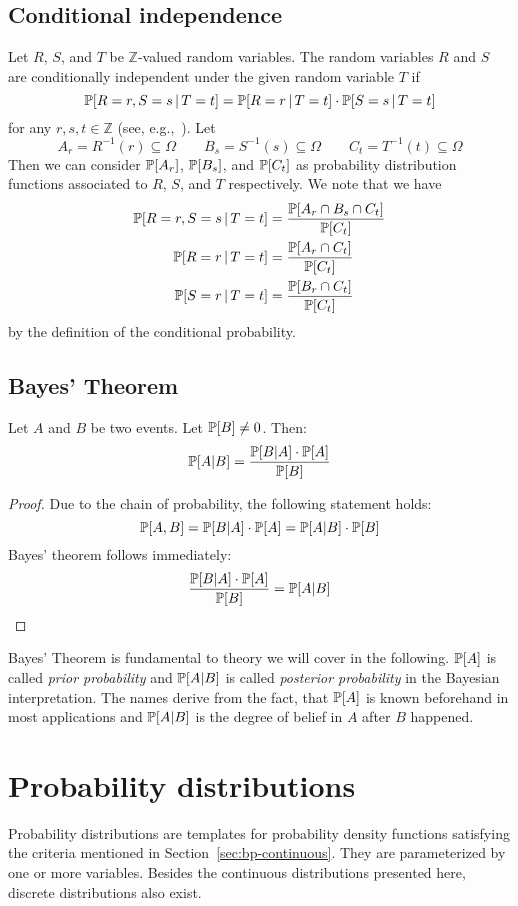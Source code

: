 \subsection{Conditional independence}
\label{sec:bp-cond-indep}
%
Let $R$, $S$, and $T$ be $\mathbb Z$-valued random variables.
The random variables $R$ and $S$ are conditionally independent under the given random variable $T$
if
\[
  \mathbb P[R=r, S=s\,|\,T=t] =
  \mathbb P[R=r\,|\,T=t] \cdot \mathbb P[S=s\,|\,T=t]
\]
for any $r, s, t \in \mathbb Z$ (see, e.g.,~\cite[3.1]{dawid}).
Let
\[
  A_r = R^{-1}(r) \subseteq \Omega \qquad
  B_s = S^{-1}(s) \subseteq \Omega \qquad
  C_t = T^{-1}(t) \subseteq \Omega
\]
Then we can consider $\mathbb P[A_r]$, $\mathbb P[B_s]$, and $\mathbb P[C_t]$ as probability distribution functions associated to $R$, $S$, and $T$ respectively.
We note that we have
\begin{align*}
  \mathbb P[R=r, S=s\,|\,T=t] &= \frac{\mathbb P[A_r \cap B_s \cap C_t]}{\mathbb P[C_t]} \\
  \mathbb P[R=r\,|\,T=t] &= \frac{\mathbb P[A_r \cap C_t]}{\mathbb P[C_t]} \\
  \mathbb P[S=r\,|\,T=t] &= \frac{\mathbb P[B_r \cap C_t]}{\mathbb P[C_t]}
\end{align*}
by the definition of the conditional probability.

\subsection{Bayes' Theorem}
\label{sec:bp-bayes}
%
\begin{theorem}
  Let $A$ and $B$ be two events. Let $\mathbb P[B] \neq 0$. Then:
  \[ \mathbb P[A|B] = \frac{\mathbb P[B|A] \cdot \mathbb P[A]}{\mathbb P[B]} \]
\end{theorem}
\begin{proof}
  Due to the chain of probability, the following statement holds:
  \[ \mathbb P[A,B] = \mathbb P[B|A] \cdot \mathbb P[A] = \mathbb P[A|B] \cdot \mathbb P[B] \]
  Bayes' theorem follows immediately:
  \[ \frac{\mathbb P[B|A] \cdot \mathbb P[A]}{\mathbb P[B]} = \mathbb P[A|B] \]
\end{proof}

Bayes' Theorem is fundamental to theory we will cover in the following.
$\mathbb P[A]$ is called \emph{prior probability} and $\mathbb P[A|B]$ is called \emph{posterior probability} in the Bayesian interpretation.
The names derive from the fact, that $\mathbb P[A]$ is known beforehand in most applications and $\mathbb P[A|B]$ is the degree of belief in $A$ after $B$ happened.

\section{Probability distributions}
\label{sec:bp-dist}
%
Probability distributions are templates for probability density functions
satisfying the criteria mentioned in Section~\ref{sec:bp-continuous}.
They are parameterized by one or more variables.
Besides the continuous distributions presented here, discrete distributions also exist.

